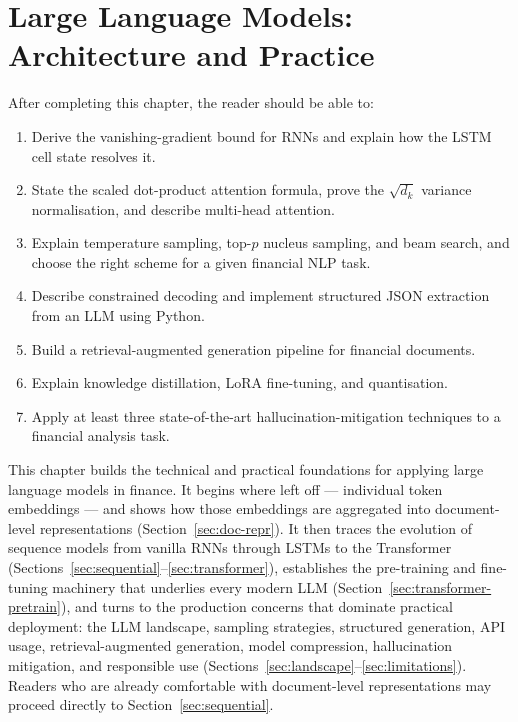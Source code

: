 \chapter{Large Language Models: Architecture and Practice}
\label{ch:llm-foundations}

\begin{remark}
After completing this chapter, the reader should be able to:
\begin{enumerate}
  \item Derive the vanishing-gradient bound for RNNs and explain how the LSTM cell
        state resolves it.
  \item State the scaled dot-product attention formula, prove the $\sqrt{d_k}$
        variance normalisation, and describe multi-head attention.
  \item Explain temperature sampling, top-$p$ nucleus sampling, and beam search,
        and choose the right scheme for a given financial NLP task.
  \item Describe constrained decoding and implement structured JSON extraction
        from an LLM using Python.
  \item Build a retrieval-augmented generation pipeline for financial documents.
  \item Explain knowledge distillation, LoRA fine-tuning, and quantisation.
  \item Apply at least three state-of-the-art hallucination-mitigation techniques
        to a financial analysis task.
\end{enumerate}
\end{remark}

This chapter builds the technical and practical foundations for applying large language
models in finance.
It begins where  left off --- individual token embeddings --- and shows how
those embeddings are aggregated into document-level representations (Section~\ref{sec:doc-repr}).
It then traces the evolution of sequence models from vanilla RNNs through LSTMs to the
Transformer (Sections~\ref{sec:sequential}--\ref{sec:transformer}), establishes the
pre-training and fine-tuning machinery that underlies every modern LLM
(Section~\ref{sec:transformer-pretrain}), and turns to the production
concerns that dominate practical deployment: the LLM landscape, sampling strategies,
structured generation, API usage, retrieval-augmented generation, model compression,
hallucination mitigation, and responsible use
(Sections~\ref{sec:landscape}--\ref{sec:limitations}).
Readers who are already comfortable with document-level representations may proceed
directly to Section~\ref{sec:sequential}.

